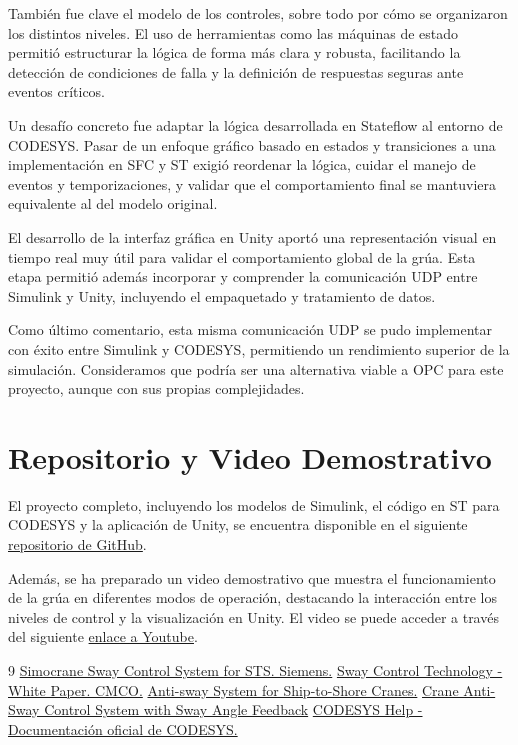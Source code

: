 \documentclass[11pt]{article}                                    %
\begin{document}
También fue clave el modelo de los controles, sobre todo por cómo se organizaron los distintos niveles. El uso de herramientas como las máquinas de estado permitió estructurar la lógica de forma más clara y robusta, facilitando la detección de condiciones de falla y la definición de respuestas seguras ante eventos críticos.

Un desafío concreto fue adaptar la lógica desarrollada en Stateflow al entorno de CODESYS. Pasar de un enfoque gráfico basado en estados y transiciones a una implementación en SFC y ST exigió reordenar la lógica, cuidar el manejo de eventos y temporizaciones, y validar que el comportamiento final se mantuviera equivalente al del modelo original.

El desarrollo de la interfaz gráfica en Unity aportó una representación visual en tiempo real muy útil para validar el comportamiento global de la grúa. Esta etapa permitió además incorporar y comprender la comunicación UDP entre Simulink y Unity, incluyendo el empaquetado y tratamiento de datos. 

Como último comentario, esta misma comunicación UDP se pudo implementar con éxito entre Simulink y CODESYS, permitiendo un rendimiento superior de la simulación. Consideramos que podría ser una alternativa viable a OPC para este proyecto, aunque con sus propias complejidades.

\section{Repositorio y Video Demostrativo}
El proyecto completo, incluyendo los modelos de Simulink, el código en ST para CODESYS y la aplicación de Unity, se encuentra disponible en el siguiente \href{https://github.com/nahuelpucciarelli/AyCD-Proyecto.git}{repositorio de GitHub}.

Además, se ha preparado un video demostrativo que muestra el funcionamiento de la grúa en diferentes modos de operación, destacando la interacción entre los niveles de control y la visualización en Unity. El video se puede acceder a través del siguiente \href{https://www.youtube.com/watch?v=KdlOn0zeDz8}{enlace a Youtube}.

\newpage
\begin{thebibliography}{9}
 \href{https://assets.new.siemens.com/siemens/assets/api/uuid:e50a2d23-95fc-401a-8f4b-a6aec736a100/simocrane-sway-control-system-for-sts.pdf}{Simocrane Sway Control System for STS. Siemens.}
 \href{https://www.cmco.com/globalassets/case-studies/sway-control-technology/swaycontrolwhitepaper.pdf}{Sway Control Technology - White Paper. CMCO.}
 \href{https://sci-hub.st/10.5545/sv-jme.2010.127}{Anti-sway System for Ship-to-Shore Cranes.}
 \href{https://sci-hub.st/10.1109/ICIEAM.2018.8728750}{Crane Anti-Sway Control System with Sway Angle Feedback}
 \href{https://www.helpme-codesys.com/}{CODESYS Help - Documentación oficial de CODESYS.}
\end{thebibliography}
\end{document}
